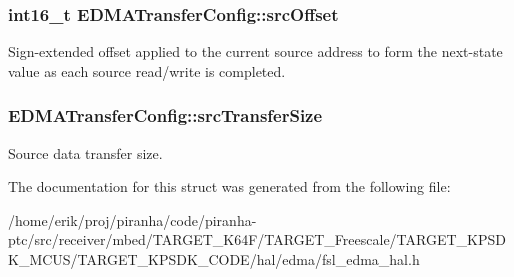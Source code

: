 \subsubsection[{\texorpdfstring{src\+Offset}{srcOffset}}]{\setlength{\rightskip}{0pt plus 5cm}int16\+\_\+t E\+D\+M\+A\+Transfer\+Config\+::src\+Offset}\hypertarget{structEDMATransferConfig_a0fa681434c8a95d906b11ac74798b268}{}\label{structEDMATransferConfig_a0fa681434c8a95d906b11ac74798b268}
Sign-\/extended offset applied to the current source address to form the next-\/state value as each source read/write is completed. 
\subsubsection[{\texorpdfstring{src\+Transfer\+Size}{srcTransferSize}}]{ E\+D\+M\+A\+Transfer\+Config\+::src\+Transfer\+Size}\hypertarget{structEDMATransferConfig_a6d0b69a4f58895eeaeaaec447c4fae23}{}\label{structEDMATransferConfig_a6d0b69a4f58895eeaeaaec447c4fae23}
Source data transfer size. 

The documentation for this struct was generated from the following file\+:\begin{DoxyCompactItemize}
\item 
/home/erik/proj/piranha/code/piranha-\/ptc/src/receiver/mbed/\+T\+A\+R\+G\+E\+T\+\_\+\+K64\+F/\+T\+A\+R\+G\+E\+T\+\_\+\+Freescale/\+T\+A\+R\+G\+E\+T\+\_\+\+K\+P\+S\+D\+K\+\_\+\+M\+C\+U\+S/\+T\+A\+R\+G\+E\+T\+\_\+\+K\+P\+S\+D\+K\+\_\+\+C\+O\+D\+E/hal/edma/fsl\+\_\+edma\+\_\+hal.\+h\end{DoxyCompactItemize}
